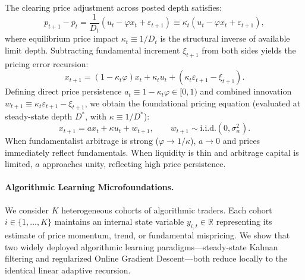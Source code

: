 \documentclass[12pt]{article}
\theoremstyle{definition}
\theoremstyle{remark}
\newcommand{\R}{\mathbb{R}}
\begin{document}
The clearing price adjustment across posted depth satisfies:
\begin{equation}
p_{t+1} - p_t = \frac{1}{D_t} \left( u_t - \varphi x_t + \varepsilon_{t+1} \right) \equiv \kappa_t \left( u_t - \varphi x_t + \varepsilon_{t+1} \right),
\end{equation}
where equilibrium price impact $\kappa_t \equiv 1/D_t$ is the structural inverse of available limit depth. Subtracting fundamental increment $\xi_{t+1}$ from both sides yields the pricing error recursion:
\begin{equation}
x_{t+1} = (1 - \kappa_t \varphi) x_t + \kappa_t u_t + \left( \kappa_t \varepsilon_{t+1} - \xi_{t+1} \right).
\end{equation}
Defining direct price persistence $a_t \equiv 1 - \kappa_t \varphi \in [0, 1)$ and combined innovation $w_{t+1} \equiv \kappa_t \varepsilon_{t+1} - \xi_{t+1}$, we obtain the foundational pricing equation (evaluated at steady-state depth $D^*$, with $\kappa \equiv 1/D^*$):
\begin{equation}
x_{t+1} = a x_t + \kappa u_t + w_{t+1}, \qquad w_{t+1} \sim \text{i.i.d.}(0, \sigma_w^2).
\label{eq:micro_pricing}
\end{equation}
When fundamentalist arbitrage is strong ($\varphi \to 1/\kappa$), $a \to 0$ and prices immediately reflect fundamentals. When liquidity is thin and arbitrage capital is limited, $a$ approaches unity, reflecting high price persistence.

\paragraph{Algorithmic Learning Microfoundations.}
We consider $K$ heterogeneous cohorts of algorithmic traders. Each cohort $i \in \{1, \dots, K\}$ maintains an internal state variable $y_{i,t} \in \R$ representing its estimate of price momentum, trend, or fundamental mispricing. We show that two widely deployed algorithmic learning paradigms—steady-state Kalman filtering and regularized Online Gradient Descent—both reduce locally to the identical linear adaptive recursion.
\end{document}
